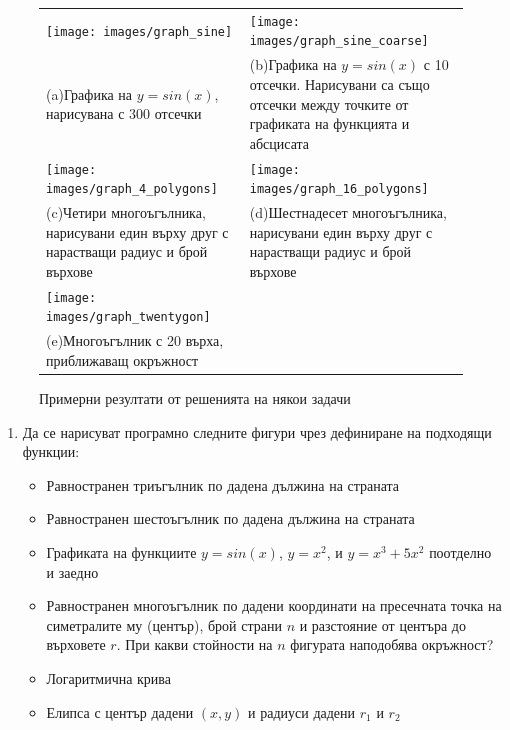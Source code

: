 {\begin{figure}
  \begin{center}
  \begin{tabular}{|p{5.2cm}p{5.2cm}|}
   \hline
   \vspace{10pt}
   \texttt{[image: images/graph\_sine]} &
   \vspace{10pt}
   \texttt{[image: images/graph\_sine\_coarse]}\\
   (a)Графика на $y=sin(x)$, нарисувана с 300 отсечки&
   (b)Графика на $y=sin(x)$ с 10 отсечки. Нарисувани са също отсечки между точките от графиката на функцията и абсцисата\\%
   \vspace{10pt}
   \texttt{[image: images/graph\_4\_polygons]}  &
   \vspace{10pt}
   \texttt{[image: images/graph\_16\_polygons]}  \\
   (c)Четири многоъгълника, нарисувани един върху друг с нарастващи радиус и брой върхове
   \vspace{10pt}&
   (d)Шестнадесет многоъгълника, нарисувани един върху друг с нарастващи радиус и брой върхове
   \vspace{10pt}  \\%
   \vspace{10pt}
   \texttt{[image: images/graph\_twentygon]}   &
    \\
    (e)Многоъгълник с 20 върха, приближаващ окръжност
   \vspace{10pt} &
   \\\hline
  \end{tabular}
  \end{center}

  \caption{Примерни резултати от решенията на някои задачи}
  \label{fig:drawings}
\end{figure}



\begin{enumerate}[resume]


	\item Да се нарисуват програмно следните фигури чрез дефиниране на подходящи функции:

	\begin{itemize}
		\item Равностранен триъгълник по дадена дължина на страната
		\item Равностранен шестоъгълник по дадена дължина на страната
		\item Графиката на функциите $y=sin(x)$, $y=x^2$, и $y=x^3+5x^2$ поотделно и заедно
    \item Равностранен многоъгълник по дадени координати на пресечната точка на симетралите му (център), брой страни $n$ и разстояние от центъра до върховете $r$. При какви стойности на $n$ фигурата наподобява окръжност?
		\item Логаритмична крива
		\item Елипса с център дадени $(x,y)$ и радиуси дадени $r_1$ и $r_2$
	\end{itemize}


\end{enumerate}}
